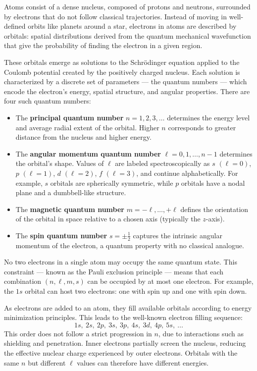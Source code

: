 Atoms consist of a dense nucleus, composed of protons and neutrons, surrounded by electrons that do not follow classical trajectories. Instead of moving in well-defined orbits like planets around a star, electrons in atoms are described by orbitals: spatial distributions derived from the quantum mechanical wavefunction that give the probability of finding the electron in a given region.

These orbitals emerge as solutions to the Schrödinger equation applied to the Coulomb potential created by the positively charged nucleus. Each solution is characterized by a discrete set of parameters — the quantum numbers — which encode the electron's energy, spatial structure, and angular properties. There are four such quantum numbers:

\begin{itemize}[leftmargin=*]
  \item The \textbf{principal quantum number} $n = 1, 2, 3, \ldots$ determines the energy level and average radial extent of the orbital. Higher $n$ corresponds to greater distance from the nucleus and higher energy.
  \item The \textbf{angular momentum quantum number} $\ell = 0, 1, \ldots, n-1$ determines the orbital's shape. Values of $\ell$ are labeled spectroscopically as $s$ $(\ell=0)$, $p$ $(\ell=1)$, $d$ $(\ell=2)$, $f$ $(\ell=3)$, and continue alphabetically. For example, $s$ orbitals are spherically symmetric, while $p$ orbitals have a nodal plane and a dumbbell-like structure.
  \item The \textbf{magnetic quantum number} $m = -\ell, \ldots, +\ell$ defines the orientation of the orbital in space relative to a chosen axis (typically the $z$-axis).
  \item The \textbf{spin quantum number} $s = \pm \tfrac{1}{2}$ captures the intrinsic angular momentum of the electron, a quantum property with no classical analogue.
\end{itemize}

No two electrons in a single atom may occupy the same quantum state. This constraint — known as the Pauli exclusion principle — means that each combination $(n, \ell, m, s)$ can be occupied by at most one electron. For example, the $1s$ orbital can host two electrons: one with spin up and one with spin down.

\medskip

As electrons are added to an atom, they fill available orbitals according to energy minimization principles. This leads to the well-known electron filling sequence:
\[
1s,\ 2s,\ 2p,\ 3s,\ 3p,\ 4s,\ 3d,\ 4p,\ 5s,\ \ldots
\]
This order does not follow a strict progression in $n$, due to interactions such as shielding and penetration. Inner electrons partially screen the nucleus, reducing the effective nuclear charge experienced by outer electrons. Orbitals with the same $n$ but different $\ell$ values can therefore have different energies.

